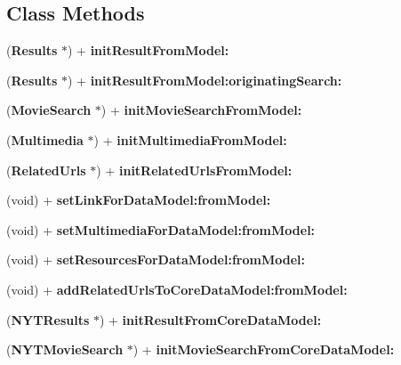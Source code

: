 \subsection*{Class Methods}
\begin{DoxyCompactItemize}
\item 
({\bf Results} $\ast$) + {\bf init\+Result\+From\+Model\+:}
\item 
({\bf Results} $\ast$) + {\bfseries init\+Result\+From\+Model\+:originating\+Search\+:}\label{interface_interact_with_model_a2b0b425a788e8dbfe5970ddd344c594a}

\item 
({\bf Movie\+Search} $\ast$) + {\bfseries init\+Movie\+Search\+From\+Model\+:}\label{interface_interact_with_model_a2e505dc10dc486915dd5d8766c39eb56}

\item 
({\bf Multimedia} $\ast$) + {\bfseries init\+Multimedia\+From\+Model\+:}\label{interface_interact_with_model_a25de369d43f2353b503de44b057da369}

\item 
({\bf Related\+Urls} $\ast$) + {\bfseries init\+Related\+Urls\+From\+Model\+:}\label{interface_interact_with_model_a3671ffeebfbf678be79fcb82c16e05a5}

\item 
(void) + {\bfseries set\+Link\+For\+Data\+Model\+:from\+Model\+:}\label{interface_interact_with_model_abc58a7e0799c221e1b903c1620c851bf}

\item 
(void) + {\bfseries set\+Multimedia\+For\+Data\+Model\+:from\+Model\+:}\label{interface_interact_with_model_a61f558c005fff5e0e90f562e470a7c2d}

\item 
(void) + {\bfseries set\+Resources\+For\+Data\+Model\+:from\+Model\+:}\label{interface_interact_with_model_ad7279eba22ca006c1a7ec5535b21950f}

\item 
(void) + {\bfseries add\+Related\+Urls\+To\+Core\+Data\+Model\+:from\+Model\+:}\label{interface_interact_with_model_a387f1a6ef89ab0df554650d084fcc512}

\item 
({\bf N\+Y\+T\+Results} $\ast$) + {\bfseries init\+Result\+From\+Core\+Data\+Model\+:}\label{interface_interact_with_model_a5530492870c3adfc95da4cd7397fdb68}

\item 
({\bf N\+Y\+T\+Movie\+Search} $\ast$) + {\bfseries init\+Movie\+Search\+From\+Core\+Data\+Model\+:}\label{interface_interact_with_model_a8277734331938744a8c6d75c418058ef}


\end{DoxyCompactItemize}
